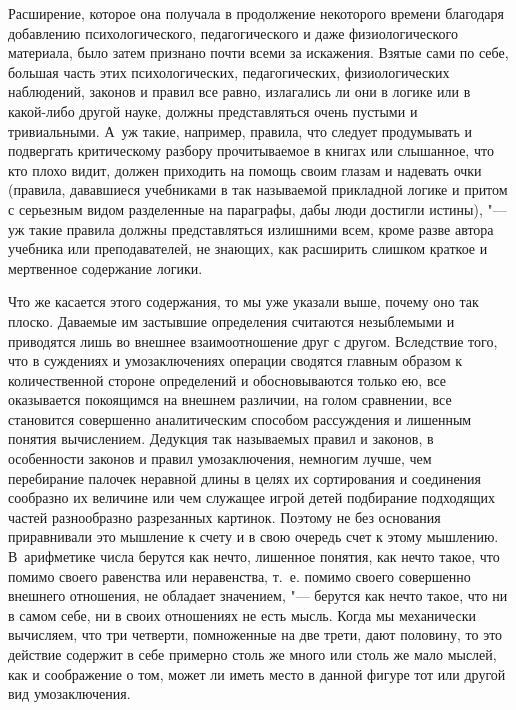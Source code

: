 Расширение, которое она получала в продолжение некоторого времени благодаря
добавлению психологического, педагогического и даже физиологического
материала, было затем признано почти всеми за искажения. Взятые сами по
себе, большая часть этих психологических, педагогических, физиологических
наблюдений, законов и правил все равно, излагались ли они в логике или в
какой-либо другой науке, должны представляться очень пустыми и
тривиальными. А~уж такие, например, правила, что следует продумывать и
подвергать критическому разбору прочитываемое в книгах или слышанное, что
кто плохо видит, должен приходить на помощь своим глазам и надевать очки
(правила, дававшиеся учебниками в так называемой прикладной логике и притом
с серьезным видом разделенные на параграфы, дабы люди достигли истины), "---
уж такие правила должны представляться излишними всем, кроме разве автора
учебника или преподавателей, не знающих, как расширить слишком краткое и
мертвенное содержание логики.

Что же касается этого содержания, то мы уже указали выше, почему оно так
плоско. Даваемые им застывшие определения считаются незыблемыми и
приводятся лишь во внешнее взаимоотношение друг с другом. Вследствие того,
что в суждениях и умозаключениях операции сводятся главным образом к
количественной стороне определений и обосновываются только ею, все
оказывается покоящимся на внешнем различии, на голом сравнении, все
становится совершенно аналитическим способом рассуждения и лишенным понятия
вычислением. Дедукция так называемых правил и законов, в особенности
законов и правил умозаключения, немногим лучше, чем перебирание палочек
неравной длины в целях их сортирования и соединения сообразно их величине
или чем служащее игрой детей подбирание подходящих частей разнообразно
разрезанных картинок. Поэтому не без основания приравнивали это мышление к
счету и в свою очередь счет к этому мышлению. В~арифметике числа берутся
как нечто, лишенное понятия, как нечто такое, что помимо своего равенства
или неравенства, т.~е. помимо своего совершенно внешнего отношения, не
обладает значением, "--- берутся как нечто такое, что ни в самом себе, ни в
своих отношениях не есть мысль. Когда мы механически вычисляем, что три
четверти, помноженные на две трети, дают половину, то это действие содержит
в себе примерно столь же много или столь же мало мыслей, как и соображение
о том, может ли иметь место в данной фигуре тот или другой вид умозаключения.

